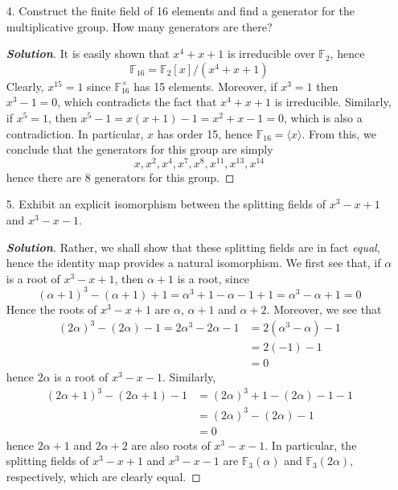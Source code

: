 \documentclass[12pt,leqno]{article}
\theoremstyle{definition}
\newcommand{\Z}{\mathbb{Z}}
\newcommand{\F}{\mathbb{F}}
\newcommand{\+}{\oplus}
\newenvironment{Proof}{\begin{proof}[\textnormal{\textbf{Proof}}]}{\end{proof}}
\newenvironment{Solution}{\begin{proof}[\textnormal{\textbf{Solution}}]}{\end{proof}}
\begin{document}
\begin{enumerate}
\begin{Proof}
     One can also look at the cylcotomic polynomials $\Phi_{p}(x)$ for $p$-prime in $\Z$. The roots of this polynomial are all distinct and differ for each prime $p$, hence there must be infinitely many different roots of unity. In particular, an algebraically closed field, which must contain all roots of unity, must be infinite.  
    \end{Proof}
   \item [4.] Construct the finite field of 16 elements and find a generator for the multiplicative group. How many generators are there?
    \begin{Solution}
     It is easily shown that $x^4+x+1$ is irreducible over $\F_2$, hence \[\F_{16}=\F_2[x]/(x^4+x+1)\] Clearly, $x^{15}=1$ since $\F_{16}^{\times}$ has 15 elements. Moreover, if $x^3=1$ then $x^3-1=0$, which contradicts the fact that $x^4+x+1$ is irreducible. Similarly, if $x^5=1$, then $x^5-1=x(x+1)-1=x^2+x-1=0$, which is also a contradiction. In particular, $x$ has order 15, hence $\F_{16}=\langle x\rangle$. From this, we conclude that the generators for this group are simply \[x,x^2,x^4,x^7,x^8,x^{11},x^{13},x^{14}\] hence there are 8 generators for this group.
    \end{Solution}
   \item [5.] Exhibit an explicit isomorphism between the splitting fields of $x^3-x+1$ and $x^3-x-1$.
    \begin{Solution}
     Rather, we shall show that these splitting fields are in fact \textit{equal}, hence the identity map provides a natural isomorphism. We first see that, if $\alpha$ is a root of $x^3-x+1$, then $\alpha+1$ is a root, since \[(\alpha+1)^3-(\alpha+1)+1=\alpha^3+1-\alpha-1+1=\alpha^3-\alpha+1=0\] Hence the roots of $x^3-x+1$ are $\alpha$, $\alpha+1$ and $\alpha+2$. Moreover, we see that \begin{align*}(2\alpha)^3-(2\alpha)-1=2\alpha^3-2\alpha-1&=2(\alpha^3-\alpha)-1\\&=2(-1)-1\\&=0\end{align*} hence $2\alpha$ is a root of $x^3-x-1$. Similarly, \begin{align*}(2\alpha+1)^3-(2\alpha+1)-1&=(2\alpha)^3+1-(2\alpha)-1-1\\&=(2\alpha)^3-(2\alpha)-1\\&=0\end{align*} hence $2\alpha+1$ and $2\alpha+2$ are also roots of $x^3-x-1$. In particular, the splitting fields of $x^3-x+1$ and $x^3-x-1$ are $\F_3(\alpha)$ and $\F_3(2\alpha)$, respectively, which are clearly equal.

\end{Solution}
\end{enumerate}
\end{document}
